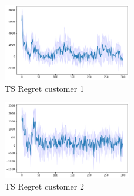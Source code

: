 \begin{multicols}{2}
    \begin{figure}[H]
        \begin{center}
        \includegraphics[width=0.5\textwidth]{img/ts7_1regret.png}
        \caption{TS Regret customer 1}
        \label{fig:Regret71}
        \end{center}
    \end{figure}
    \columnbreak
    \begin{figure}[H]
        \begin{center}
        \includegraphics[width=0.5\textwidth]{img/ts7_2regret.png}
        \caption{TS Regret customer 2}
        \label{fig:Regret72}
        \end{center}
    \end{figure}
\end{multicols}
